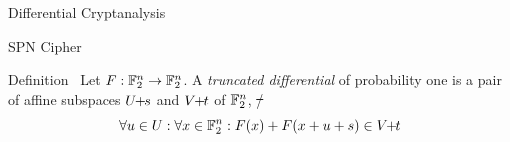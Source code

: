 \begin{frame}{Differential Cryptanalysis}
\begin{block}{SPN Cipher}
        \vspace{0.5em}
    \end{block}
    \pause
    \begin{block}{Definition~\cite{FSE:Knudsen94,FSE:BloLeaNyb14}}
        Let $F : \mathbb{F}_2^n \to \mathbb{F}_2^n$.
        A \emph{truncated differential} of probability one is a pair of affine subspaces $U \!\! + \!\! s$ and $V \!\! + \!\! t$ of $\mathbb{F}_2^n$, \st/
        \begin{equation*}
            \forall u \in U : \forall x \in \mathbb{F}_2^n : F(x) + F(x + u + s) \in V \!\! + \!\! t
        \end{equation*}
    \end{block}
\end{frame}

